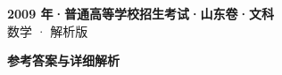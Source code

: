 \documentclass[zihao=-4, a4paper]{ctexart}
\begin{document}
\begin{center}
  {\Large\bfseries 2009 年·普通高等学校招生考试·山东卷·文科}\\[4pt]
  {\large 数学 · 解析版}
\end{center}
\medskip
{}

\clearpage
{}
\begin{center}{\Large\bfseries 参考答案与详细解析}\end{center}
\medskip

\end{document}
